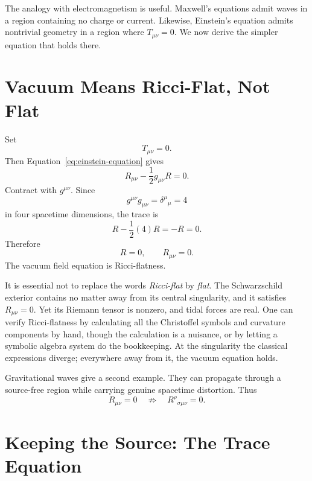 The analogy with electromagnetism is useful. Maxwell's equations admit waves
in a region containing no charge or current. Likewise, Einstein's equation
admits nontrivial geometry in a region where \(T_{\mu\nu}=0\). We now derive
the simpler equation that holds there.

\section{Vacuum Means Ricci-Flat, Not Flat}

Set
\begin{equation}
 T_{\mu\nu}=0.
\end{equation}
Then Equation~\eqref{eq:einstein-equation} gives
\begin{equation}
 R_{\mu\nu}-\frac12g_{\mu\nu}R=0.
 \label{eq:vacuum-einstein}
\end{equation}
Contract with \(g^{\mu\nu}\). Since
\begin{equation}
 g^{\mu\nu}g_{\mu\nu}
 =\delta^\mu{}_\mu=4
\end{equation}
in four spacetime dimensions, the trace is
\begin{equation}
 R-\frac12(4)R=-R=0.
\end{equation}
Therefore
\begin{equation}
 R=0,
 \qquad
 R_{\mu\nu}=0.
 \label{eq:ricci-flat}
\end{equation}
The vacuum field equation is Ricci-flatness.

It is essential not to replace the words \emph{Ricci-flat} by \emph{flat}.
The Schwarzschild exterior contains no matter away from its central
singularity, and it satisfies \(R_{\mu\nu}=0\). Yet its Riemann tensor is
nonzero, and tidal forces are real. One can verify Ricci-flatness by
calculating all the Christoffel symbols and curvature components by hand,
though the calculation is a nuisance, or by letting a symbolic algebra system
do the bookkeeping. At the singularity the classical expressions diverge;
everywhere away from it, the vacuum equation holds.

Gravitational waves give a second example. They can propagate through a
source-free region while carrying genuine spacetime distortion. Thus
\begin{equation}
 R_{\mu\nu}=0
 \quad\not\Rightarrow\quad
 R^\rho{}_{\sigma\mu\nu}=0.
\end{equation}

\section{Keeping the Source: The Trace Equation}

